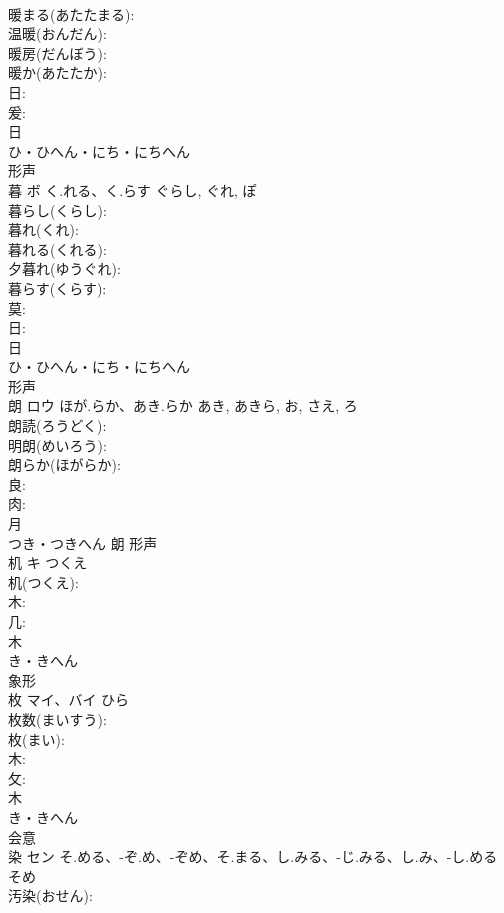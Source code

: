 \documentclass[8pt]{extreport}
\begin{document}
\begin{CJK}{UTF8}{min}
\\	暖まる(あたたまる): 
\\	温暖(おんだん): 
\\	暖房(だんぼう): 
\\	暖か(あたたか): 
\\	日: 
\\	爰: 
\\	日	
\\	ひ・ひへん・にち・にちへん	
\\	形声 
\\	暮	ボ	く.れる、く.らす	ぐらし, ぐれ, ぽ	
\\	暮らし(くらし): 
\\	暮れ(くれ): 
\\	暮れる(くれる): 
\\	夕暮れ(ゆうぐれ): 
\\	暮らす(くらす): 
\\	莫: 
\\	日: 
\\	日	
\\	ひ・ひへん・にち・にちへん	
\\	形声 
\\	朗	ロウ	ほが.らか、あき.らか	あき, あきら, お, さえ, ろ	
\\	朗読(ろうどく): 
\\	明朗(めいろう): 
\\	朗らか(ほがらか): 
\\	良: 
\\	肉: 
\\	月	
\\	つき・つきへん	朗	形声 
\\	机	キ	つくえ		
\\	机(つくえ): 
\\	木: 
\\	几: 
\\	木	
\\	き・きへん	
\\	象形 
\\	枚	マイ、バイ		ひら	
\\	枚数(まいすう): 
\\	枚(まい): 
\\	木: 
\\	攵: 
\\	木	
\\	き・きへん	
\\	会意 
\\	染	セン	そ.める、-ぞ.め、-ぞめ、そ.まる、し.みる、-じ.みる、し.み、-し.める	そめ	
\\	汚染(おせん): 

\end{CJK}
\end{document}
